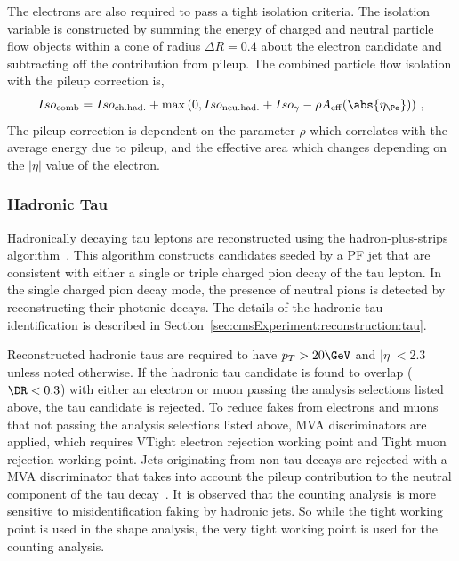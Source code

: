 \noindent The electrons are also required to pass a tight isolation criteria. The isolation variable is constructed by summing the energy of charged and neutral particle flow objects within a cone of radius $\Delta R = 0.4$ about the electron candidate and subtracting off the contribution from pileup.  The combined particle flow isolation with the pileup correction is,
\begin{equation*}
    Iso_\mathrm{comb} = Iso_\mathrm{ ch. had.} + \max\left(0, Iso_\mathrm{ neu. had.} + Iso_{\gamma} - \rho A_\mathrm{eff}(\abs{\eta_{\Pe}}) \right)\,,
\end{equation*}
\noindent The pileup correction is dependent on the parameter $\rho$ which correlates with the average energy due to pileup, and the effective area which changes depending on the $|\eta|$ value of the electron.





\subsubsection{Hadronic Tau}

Hadronically decaying tau leptons are reconstructed using the hadron-plus-strips algorithm~\cite{ref:cms-tau}. This algorithm constructs candidates seeded by a PF jet that are consistent with either a single or triple charged pion decay of the tau lepton.  In the single charged pion decay mode, the presence of neutral pions is detected by reconstructing their photonic decays. The details of the hadronic tau identification is described in Section~\ref{sec:cmsExperiment:reconstruction:tau}. 

Reconstructed hadronic taus are required to have $p_{T} > 20\GeV$ and $|\eta| < 2.3$ unless noted otherwise.  If the hadronic tau candidate is found to overlap ($\DR < 0.3$) with either an electron or muon passing the analysis selections listed above, the tau candidate is rejected. To reduce fakes from electrons and muons that not passing the analysis selections listed above, MVA discriminators are applied, which requires VTight electron rejection working point and Tight muon rejection working point. Jets originating from non-tau decays are rejected with a MVA discriminator that takes into account the pileup contribution to the neutral component of the tau decay~\cite{CMS-TAU-16-003-001}.  It is observed that the counting analysis is more sensitive to misidentification faking by hadronic jets. So while the tight working point is used in the shape analysis, the very tight working point is used for the counting analysis. 








